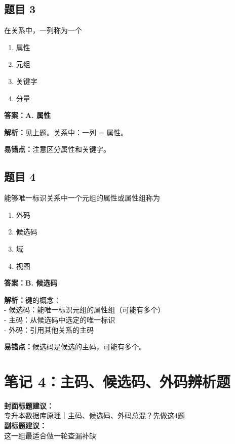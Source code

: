 \documentclass[12pt,a4paper]{ctexart}
\begin{document}
\subsection*{题目 3}
在关系中，一列称为一个
\begin{enumerate}[label=\Alph*.]
	\item 属性
	\item 元组
	\item 关键字
	\item 分量
\end{enumerate}

\begin{answerbox}
	\textbf{答案：A. 属性}

	\textbf{解析：}见上题。关系中：一列 = 属性。

	\textbf{易错点：}注意区分属性和关键字。
\end{answerbox}

\subsection*{题目 4}
能够唯一标识关系中一个元组的属性或属性组称为
\begin{enumerate}[label=\Alph*.]
	\item 外码
	\item 候选码
	\item 域
	\item 视图
\end{enumerate}

\begin{answerbox}
	\textbf{答案：B. 候选码}

	\textbf{解析：}键的概念：\\
	- 候选码：能唯一标识元组的属性组（可能有多个）\\
	- 主码：从候选码中选定的唯一标识\\
	- 外码：引用其他关系的主码

	\textbf{易错点：}候选码是候选的主码，可能有多个。
\end{answerbox}

\newpage

\section{笔记 4：主码、候选码、外码辨析题}
\begin{coverbox}
	\textbf{封面标题建议：}\\
	专升本数据库原理｜主码、候选码、外码总混？先做这4题\\
	\textbf{副标题建议：}\\
	这一组最适合做一轮查漏补缺
\end{coverbox}
\end{document}
